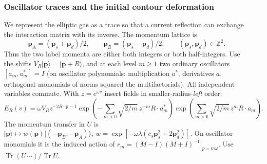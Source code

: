 \subsubsection{Oscillator traces and the initial contour deformation}
We represent the elliptic gas as a trace so that a current reflection can exchange the interaction matrix with its inverse. The momentum lattice is
\[
 \mathbf p_A=(\mathbf p_s+\mathbf p_d)/2,\qquad
 \mathbf p_B=(\mathbf p_s-\mathbf p_d)/2,
 \qquad (\mathbf p_s,\mathbf p_d)\in\mathbb Z^2.
\]
Thus the two label momenta are either both integers or both
half-integers. Use the shifts \(V_R|\mathbf p\rangle=|\mathbf p+R\rangle\), and at each level \(m\ge1\) two ordinary oscillators \([a_m,a_m^*]=I\) (on oscillator polynomials: multiplication \(a^*\), derivatives \(a\), orthogonal monomials of norms squared the multifactorials). All independent variables commute. With \(z=e^{\omega v}\) insert fields in smaller-radius-\emph{left} order:
\[
 E_R(v)=\omega V_R z^{-2R\cdot\mathbf p-1}
 \exp\left(-\sum_{m>0}\sqrt{2/m}\,z^{-m}R\cdot a_m^*\right)
 \exp\left(\sum_{m>0}\sqrt{2/m}\,z^m R\cdot a_m\right).
\]
The momentum transfer in \(U\) is \(|\mathbf p\rangle\mapsto w(\mathbf p)|(-\mathbf p_B,-\mathbf p_A)\rangle,\ w=\exp[-\omega\lambda(c_s\mathbf p_s^2+2\mathbf p_d^2)]\). On oscillator monomials it is the induced action of \(r_m=(M-I)(M+I)^{-1}|_{p=m\omega}\). Use \(\operatorname{Tr}(U\,\cdots)/\operatorname{Tr}U\).

